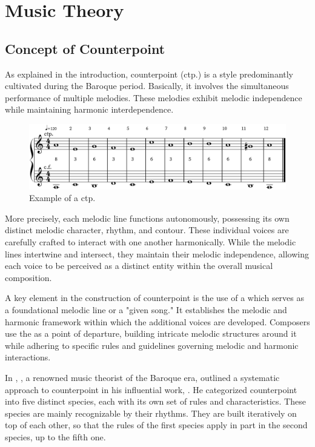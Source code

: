 \section{Music Theory}\label{sec:musictheory}

\subsection{Concept of Counterpoint}\label{sec:musictheory:counterpoint}
As explained in the introduction, counterpoint (ctp.) is a style predominantly cultivated during the Baroque period. Basically, it involves the simultaneous performance of multiple melodies\parencite{CpSachs}. These melodies exhibit melodic independence while maintaining harmonic interdependence\parencite{CpLaitz}.

\begin{figure}[h]
    \centering
    \includegraphics[height=\fhl]{Images/the_first_species.png}
    \caption{Example of a  ctp.  }
\end{figure}

More precisely, each melodic line functions autonomously, possessing its own distinct melodic character, rhythm, and contour. These individual voices are carefully crafted to interact with one another harmonically. While the melodic lines intertwine and intersect, they maintain their melodic independence, allowing each voice to be perceived as a distinct entity within the overall musical composition.

A key element in the construction of counterpoint is the use of a \cfcomma which serves as a foundational melodic line or a "given song." It establishes the melodic and harmonic framework within which the additional voices are developed. Composers use the \cf as a point of departure, building intricate melodic structures around it while adhering to specific rules and guidelines governing melodic and harmonic interactions.

In \citeyear{IMSLPlatin}, \textcite{IMSLPlatin}, a renowned music theorist of the Baroque era, outlined a systematic approach to counterpoint in his influential work, . He categorized counterpoint into five distinct species, each with its own set of rules and characteristics. These species are mainly recognizable by their rhythms. They are built iteratively on top of each other, so that the rules of the first species apply in part in the second species, up to the fifth one.

